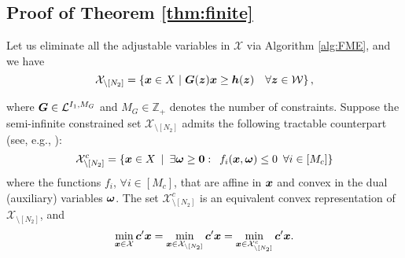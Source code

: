 \documentclass[fleqn,isre,blindrev]{informs4}
\newcommand{\mb}[1]{\mbox{\boldmath \ensuremath{#1}}}
\begin{document}
\begin{appendices}
	
	
 { \iffalse
	
\section{Proof of Theorem \ref{thm:finite} \label{proof:finitewcs} }
Let us eliminate all the adjustable variables in $\mathcal{X}$ via Algorithm \ref{alg:FME}, and we have 
\begin{equation*}
\mathcal{X}_{\setminus [N_2]} =  \left\{ \mb{x} \in X \hspace{3pt} | \hspace{3pt} \mb{G}(\mb{z}) \mb{x}  \geq\mb{h}(\mb{z})  \quad  \forall \mb{z} \in \mathcal{W} \right\},
\end{equation*}

	where $\mb{G}\in \mathcal{L}^{I_1,M_G}$ and $M_G \in \mathbb{Z}_+$ denotes the number of constraints. Suppose the semi-infinite constrained set $\mathcal{X}_{\setminus [N_2]}$ admits the following tractable counterpart (see, e.g., \cite{bdv15,gbbd14}):
\begin{equation*}
	\mathcal{X}^{c}_{\setminus [N_2]} =\left\{ \mb{x} \in X \enskip | \enskip \exists \mb{\omega} \ge \mb{0}: \enskip f_i(\mb{x}, \mb{\omega}) \le 0 \enskip \forall i\in [M_c] \right\}
\end{equation*}
	where the functions $f_i$, $\forall i\in [M_c]$, that are affine in $\mb{x}$ and convex in the dual (auxiliary) variables $\mb{\omega}$. The set $\mathcal{X}^{c}_{\setminus [N_2]}$ is an equivalent convex representation of $\mathcal{X}_{\setminus [N_2]}$, and
\begin{equation} \label{eq:convexref}
	\min_{\boldsymbol{x} \in \mathcal{X}} \mb{c}'\mb{x} =\min_{\boldsymbol{x} \in \mathcal{X}_{\setminus [N_2]}} \mb{c}'\mb{x} = \min_{\boldsymbol{x} \in \mathcal{X}^{c}_{\setminus [N_2]}} \mb{c}'\mb{x}.
\end{equation}
   
}
\end{appendices}
\end{document}
